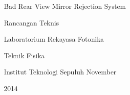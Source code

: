 \documentclass[11pt,fleqn]{book} %
\begin{document}
\begingroup
\thispagestyle{empty}
  \centering
  \vspace*{9cm}
  \par\normalfont\fontsize{35}{35}\sffamily\selectfont
  Bad Rear View Mirror Rejection System\par %
  \vspace*{1cm}
  {\Huge Rancangan Teknis}\par %
  \vspace*{1cm}
  {\large Laboratorium Rekayasa Fotonika}\par
  {\large Teknik Fisika}\par
  {\large Institut Teknologi Sepuluh November}\par
  {\large 2014}\par
\endgroup
\end{document}
